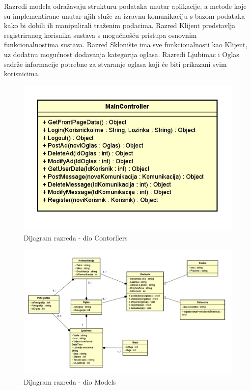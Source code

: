 			
			
			Razredi modela odražavaju strukturu podataka unutar aplikacije, a metode koje su implementirane unutar njih služe za izravnu komunikaciju s bazom podataka kako bi dobili ili manipulirali traženim podacima. Razred Klijent predstavlja registriranog korisnika sustava s mogućnošću pristupa osnovnim funkcionalnostima sustava. Razred Sklonište ima sve funkcionalnosti kao Klijent, uz dodatnu mogućnost dodavanja kategorija oglasa. Razredi Ljubimac i Oglas sadrže informacije potrebne za stvaranje oglasa koji će biti prikazani svim korisnicima.
			
			\begin{figure}[H]
				
				\includegraphics[scale =0.4]{kontroler.JPEG}
				\centering
				\caption{Dijagram razreda - dio Contorllers}
				\label{fig:your_label}
			\end{figure}
			
			\begin{figure}[H]
				
				\includegraphics[scale =0.4]{model.JPEG}
				\centering
				\caption{Dijagram razreda - dio Models}
				\label{fig:your_label}
			\end{figure}
		
